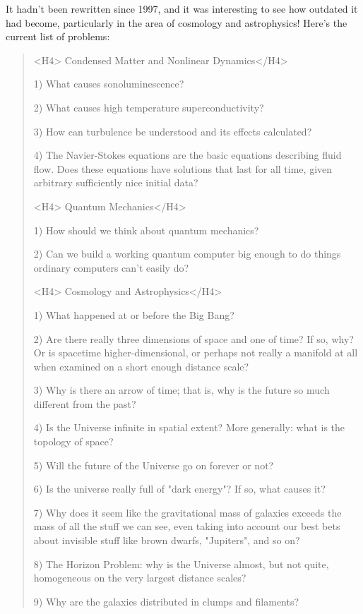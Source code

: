 It hadn't been rewritten since 1997, and it was interesting to see
how outdated it had become, particularly in the area of cosmology
and astrophysics!  Here's the current list of problems:

\begin{quote}
<H4> Condensed Matter and Nonlinear Dynamics</H4>

 1) What causes sonoluminescence?

 2) What causes high temperature superconductivity?
  
 3) How can turbulence be understood and its effects calculated?

 4) The Navier-Stokes equations are the basic equations describing 
    fluid flow.  Does these equations have solutions that last for 
    all time, given arbitrary sufficiently nice initial data?

<H4> Quantum Mechanics</H4>

 1) How should we think about quantum mechanics?

 2) Can we build a working quantum computer big enough to do things
    ordinary computers can't easily do?

<H4> Cosmology and Astrophysics</H4>

 1) What happened at or before the Big Bang?

 2) Are there really three dimensions of space and one of time?
    If so, why?  Or is spacetime higher-dimensional, or perhaps 
    not really a manifold at all when examined on a short enough 
    distance scale?

 3) Why is there an arrow of time; that is, why is the future so 
    much different from the past?

 4) Is the Universe infinite in spatial extent?  More generally:
    what is the topology of space?

 5) Will the future of the Universe go on forever or not?

 6) Is the universe really full of "dark energy"?  If so, what 
    causes it?

 7) Why does it seem like the gravitational mass of galaxies exceeds
    the mass of all the stuff we can see, even taking into account 
    our best bets about invisible stuff like brown dwarfs, "Jupiters", 
    and so on?

 8) The Horizon Problem: why is the Universe almost, but not quite,
    homogeneous on the very largest distance scales? 

 9) Why are the galaxies distributed in clumps and filaments?


\end{quote}
